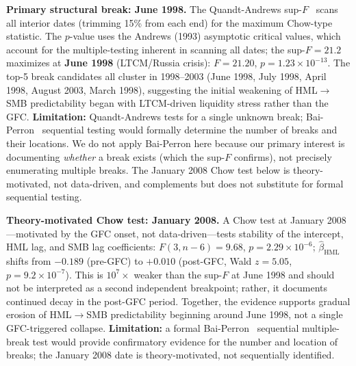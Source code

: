 \documentclass[sigconf,anonymous]{acmart}
\begin{document}
\textbf{Primary structural break: June 1998.}
The Quandt-Andrews sup-$F$~\cite{andrews1993tests} scans all interior dates
(trimming 15\% from each end) for the maximum Chow-type statistic.
The $p$-value uses the Andrews (1993) asymptotic critical values,
which account for the multiple-testing inherent in scanning all dates;
the sup-$F = 21.2$ maximizes at \textbf{June 1998} (LTCM/Russia crisis):
$F = 21.20$, $p = 1.23 \times 10^{-13}$.
The top-5 break candidates all cluster in 1998--2003
(June 1998, July 1998, April 1998, August 2003, March 1998),
suggesting the initial weakening of HML$\to$SMB predictability began with
LTCM-driven liquidity stress rather than the GFC.
\textbf{Limitation:} Quandt-Andrews tests for a single unknown break;
Bai-Perron~\cite{bai2003computation} sequential testing would formally
determine the number of breaks and their locations. We do not apply
Bai-Perron here because our primary interest is documenting \emph{whether}
a break exists (which the sup-$F$ confirms), not precisely enumerating
multiple breaks. The January 2008 Chow test below is theory-motivated,
not data-driven, and complements but does not substitute for formal
sequential testing.

\textbf{Theory-motivated Chow test: January 2008.}
A Chow test at January 2008---motivated by the GFC onset, not data-driven---tests
stability of the intercept, HML lag, and SMB lag coefficients:
$F(3,n-6) = 9.68$, $p = 2.29 \times 10^{-6}$; $\hat{\beta}_{\text{HML}}$ shifts
from $-0.189$ (pre-GFC) to $+0.010$ (post-GFC, Wald $z = 5.05$, $p = 9.2 \times 10^{-7}$).
This is $10^{7}\times$ weaker than the sup-$F$ at June 1998 and should not be interpreted
as a second independent breakpoint; rather, it documents continued decay in the
post-GFC period.
Together, the evidence supports gradual erosion of HML$\to$SMB
predictability beginning around June 1998, not a single GFC-triggered collapse.
\textbf{Limitation:} a formal Bai-Perron~\cite{bai2003computation} sequential
multiple-break test would provide confirmatory evidence for the number and location
of breaks; the January 2008 date is theory-motivated, not sequentially identified.
\end{document}
